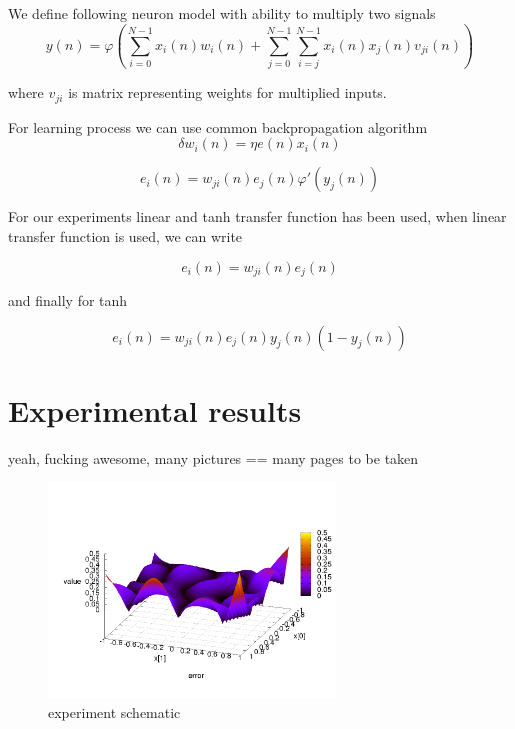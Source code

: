 \documentclass[10pt,a5paper]{article}
\begin{document}
We define following neuron model with ability to multiply two signals
\begin{equation}
\label{eq:testing_neuron}
  y(n) = \varphi( \sum_{i = 0}^{N-1} x_i(n)w_i(n) + \sum_{j = 0}^{N-1}\sum_{i = j}^{N-1} x_i(n)x_j(n)v_{ji}(n) )
\end{equation}

where $v_{ji}$ is matrix representing weights for multiplied inputs.

For learning process we can use common backpropagation algorithm
\begin{equation}
\label{eq:testing_neuron_learning}
    \delta w_i(n) = \eta e(n) x_i(n)
\end{equation}

\begin{equation}
\label{eq:testing_neuron_back}
    e_i(n) = w_{j i}(n) e_j(n) \varphi ' (y_j(n))
\end{equation}

For our experiments linear and tanh transfer function has been used, when linear transfer function
is used, we can write

\begin{equation}
\label{eq:testing_neuron_back_lin}
    e_i(n) = w_{j i}(n) e_j(n)
\end{equation}

and finally for tanh

\begin{equation}
\label{eq:testing_neuron_back_tanh}
    e_i(n) = w_{j i}(n) e_j(n) y_j(n)(1 - y_j(n))
\end{equation}


\section{Experimental results}

yeah, fucking awesome, many pictures == many pages to be taken

\begin{figure}[!ht]
\centering
\includegraphics[width=3.0in]{pictures/results/mcculloch_pitts_neuron_1_layer/experiment_2/result_log_error.png}
\caption{experiment schematic}
\label{experiment schematic}
\end{figure}
\end{document}
